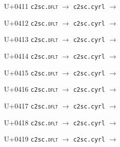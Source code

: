 \documentclass{article}
\begin{document}
\begin{substitutions}
\goodbreak

U+0411  \linebreak
    \texttt{c2sc.\textsc{dflt}} $\to$  \linebreak
    \texttt{c2sc.cyrl} $\to$  

\goodbreak

U+0412  \linebreak
    \texttt{c2sc.\textsc{dflt}} $\to$  \linebreak
    \texttt{c2sc.cyrl} $\to$  

\goodbreak

U+0413  \linebreak
    \texttt{c2sc.\textsc{dflt}} $\to$  \linebreak
    \texttt{c2sc.cyrl} $\to$  

\goodbreak

U+0414  \linebreak
    \texttt{c2sc.\textsc{dflt}} $\to$  \linebreak
    \texttt{c2sc.cyrl} $\to$  

\goodbreak

U+0415  \linebreak
    \texttt{c2sc.\textsc{dflt}} $\to$  \linebreak
    \texttt{c2sc.cyrl} $\to$  

\goodbreak

U+0416  \linebreak
    \texttt{c2sc.\textsc{dflt}} $\to$  \linebreak
    \texttt{c2sc.cyrl} $\to$  

\goodbreak

U+0417  \linebreak
    \texttt{c2sc.\textsc{dflt}} $\to$  \linebreak
    \texttt{c2sc.cyrl} $\to$  

\goodbreak

U+0418  \linebreak
    \texttt{c2sc.\textsc{dflt}} $\to$  \linebreak
    \texttt{c2sc.cyrl} $\to$  

\goodbreak

U+0419  \linebreak
    \texttt{c2sc.\textsc{dflt}} $\to$  \linebreak
    \texttt{c2sc.cyrl} $\to$  


\end{substitutions}
\end{document}
